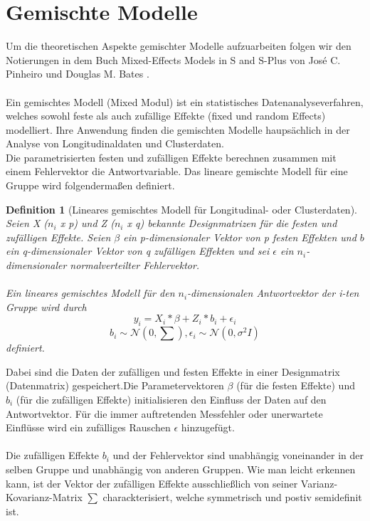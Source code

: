 \documentclass[%
thesis=student,%
coverpage=false,%
titlepage=false,%
headmarks=true, %
german,%
font=libertine, %
math=newpxtx, %
BCOR=5mm,%
coverBCOR=11mm%
]{tumbook}
\theoremstyle{break}
\newtheorem{definition}{Definition}[section]
\begin{document}
\section{Gemischte Modelle}
Um die theoretischen Aspekte gemischter Modelle aufzuarbeiten folgen wir den Notierungen in dem Buch \cite{pinheiro2000} Mixed-Effects Models in S and S-Plus  von José C. Pinheiro und Douglas M. Bates \cite{pinheiro2000}.\\
\\
Ein gemischtes Modell (Mixed Modul) ist ein statistisches Datenanalyseverfahren, welches sowohl feste als auch zufällige Effekte (fixed und random Effects) modelliert. Ihre Anwendung finden die gemischten Modelle haupsächlich in der Analyse von Longitudinaldaten und Clusterdaten.\\
Die parametrisierten festen und zufälligen Effekte berechnen zusammen mit einem Fehlervektor die Antwortvariable. Das lineare gemischte Modell für eine Gruppe wird folgendermaßen definiert.
\begin{definition}[Lineares gemischtes Modell für Longitudinal- oder Clusterdaten] 
	Seien X ($n_i$ x p) und Z ($n_i$ x q) bekannte Designmatrizen für die festen und zufälligen Effekte. Seien $\beta$ ein p-dimensionaler Vektor von p festen Effekten und $b$ ein q-dimensionaler Vektor von q zufälligen Effekten und sei $\epsilon$ ein $n_i$-dimensionaler normalverteilter Fehlervektor.\\
	\\
	Ein lineares gemischtes Modell für den $n_i$-dimensionalen Antwortvektor der i-ten Gruppe wird durch 
	$$y_i = X_i * \beta + Z_i * b_i + \epsilon_i$$ 
	$$b_i \sim \mathcal{N}(0,\sum), \epsilon_i \sim \mathcal{N}(0,\sigma^2I)$$
	definiert.
\end{definition}\noindent
Dabei sind die Daten der zufälligen und festen Effekte in einer Designmatrix (Datenmatrix) gespeichert.Die Parametervektoren $\beta$ (für die festen Effekte) und $b_i$ (für die zufälligen Effekte) initialisieren den Einfluss der Daten auf den Antwortvektor. Für die immer auftretenden Messfehler oder unerwartete Einflüsse wird ein zufälliges Rauschen $\epsilon$ hinzugefügt.\\
\\
Die zufälligen Effekte $b_i$ und der Fehlervektor sind unabhängig voneinander in der selben Gruppe und unabhängig von anderen Gruppen. Wie man leicht erkennen kann, ist der Vektor der zufälligen Effekte ausschließlich von seiner Varianz-Kovarianz-Matrix $\sum$ charackterisiert, welche symmetrisch und postiv semidefinit ist.
\end{document}
